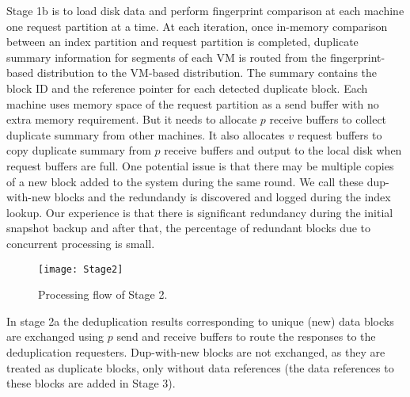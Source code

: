 Stage 1b is to load disk data and perform fingerprint comparison at each machine one request partition at a time.
At each iteration, once in-memory comparison between an index partition and request partition is completed,  
duplicate summary information for segments of each VM is routed from the fingerprint-based distribution  to the
VM-based distribution.  The summary contains the block ID and  the reference pointer for each detected duplicate block.   
Each machine uses memory space of the request partition as a send buffer with no extra memory requirement.
But it needs to allocate $p$ receive buffers to collect duplicate summary from other machines.
It also allocates $v$ request buffers to copy duplicate summary from $p$ receive buffers and output to the local disk
when request buffers are full. One potential issue is that there may be
multiple copies of a new block added to the system during the same round.
We call these dup-with-new blocks and the redundandy is discovered and
logged during the index lookup.
Our experience is that there is significant redundancy during the initial snapshot backup and after
that, the percentage of redundant blocks due to concurrent processing  is small.

\begin{figure}[th]
\centering
\texttt{[image: Stage2]}
\caption{Processing flow of Stage 2.}
\label{fig:stage2}
\end{figure}

In stage 2a the deduplication results corresponding to unique (new) data blocks
are exchanged using $p$ send and receive buffers to route the responses to the
deduplication requesters. Dup-with-new blocks are not exchanged, as they are
treated as duplicate blocks, only without data references (the data references
to these blocks are added in Stage 3).

